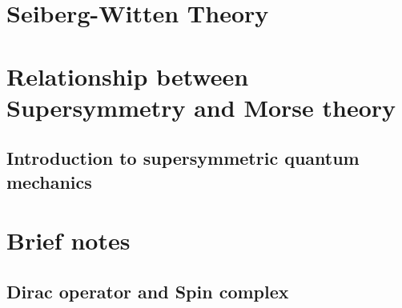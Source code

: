 \documentclass[a4paper,pdftex,10pt]{report}
\begin{document}
\clearpage
\appendix
\chapter{Seiberg-Witten Theory}




























\clearpage
\chapter{Relationship between Supersymmetry and Morse theory}



\section{Introduction to supersymmetric quantum mechanics}
























\clearpage
\chapter{Brief notes}

\section{Dirac operator and Spin complex}














\clearpage



\nocite{Peskin:1995}
\nocite{Nair:2005}
\nocite{Weinberg:1996kr}
\nocite{Weinberg:1995mt}
\nocite{Weinberg:2000}

\nocite{Witten:1982df}
\nocite{Witten:1982im}

\nocite{Seiberg:1994aj}
\nocite{Seiberg:1994rs}
\nocite{Alvarez-Gaume:1996ohl}
\nocite{Tachikawa:2013kta}

\end{document}
